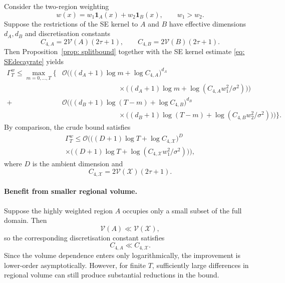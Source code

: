 \begin{corollary}
Consider the two-region weighting
\begin{equation*}
w(x)
=
w_1\mathbf 1_A(x)
+
w_2\mathbf 1_B(x),
\qquad
w_1>w_2.
\end{equation*}
Suppose the restrictions of the SE kernel to $A$ and $B$ have effective dimensions $d_A,d_B$ and discretisation constants
\begin{equation*}
C_{4,A}
=
2\mathcal V(A)(2\tau+1),
\qquad
C_{4,B}
=
2\mathcal V(B)(2\tau+1).
\end{equation*}
Then Proposition~\ref{prop: splitbound} together with the SE kernel estimate \eqref{eq: SEdecayrate} yields
\begin{align*}
\Gamma_T^w
\leq
\max_{m=0,\dots,T}
\Bigg\{
&
\mathcal O
\Big(
\big(
(d_A+1)\log m+\log C_{4,A}
\big)^{d_A}
\\
&\qquad\qquad\qquad\qquad \times
\big(
(d_A+1)\log m
+
\log(C_{4,A}w_1^2/\sigma^2)
\big)
\Big)
\\
+
&
\mathcal O
\Big(
\big(
(d_B+1)\log(T-m)+\log C_{4,B}
\big)^{d_B}
\\
&\qquad\qquad\qquad\qquad \times
\big(
(d_B+1)\log(T-m)
+
\log(C_{4,B}w_2^2/\sigma^2)
\big)
\Big)
\Bigg\}.
\end{align*}
By comparison, the crude bound satisfies
\begin{align*}
\Gamma_T^w
\leq
\mathcal O
\Big(
\big(
(D+1)\log T+\log C_{4,\mathcal X}
\big)^D
\\
\times
\big(
(D+1)\log T
+
\log(C_{4,\mathcal X}w_1^2/\sigma^2)
\big)
\Big),
\end{align*}
where $D$ is the ambient dimension and
\begin{equation*}
C_{4,\mathcal X}
=
2\mathcal V(\mathcal X)(2\tau+1).
\end{equation*}
\end{corollary}
\paragraph{Benefit from smaller regional volume.}

Suppose the highly weighted region $A$ occupies only a small subset of the full domain. Then
\begin{equation*}
\mathcal V(A)\ll \mathcal V(\mathcal X),
\end{equation*}
so the corresponding discretisation constant satisfies
\begin{equation*}
C_{4,A}\ll C_{4,\mathcal X}.
\end{equation*}
Since the volume dependence enters only logarithmically, the improvement is lower-order asymptotically. However, for finite $T$, sufficiently large differences in regional volume can still produce substantial reductions in the bound.

